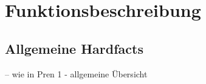 \documentclass[main.tex]{subfiles} %
\begin{document}

\section{Funktionsbeschreibung}

\subsection{Allgemeine Hardfacts}
-- wie in Pren 1 - allgemeine Übersicht


\newpage


\newpage


\newpage
\end{document}
